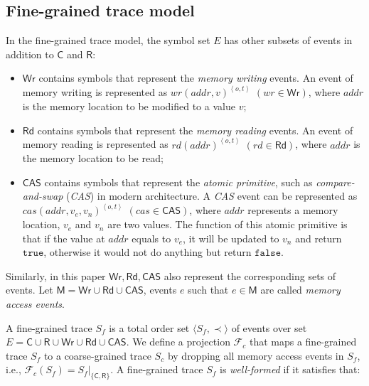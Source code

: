 \documentclass[runningheads]{llncs}
\newcommand{\ecall}{\mathsf{C}}
\newcommand{\eresp}{\mathsf{R}}
\newcommand{\ewrite}{\mathsf{Wr}}
\newcommand{\eread}{\mathsf{Rd}}
\newcommand{\ecas}{\mathsf{CAS}}
\newcommand{\pair}[1]{{\langle{#1}\rangle}}
\begin{document}
\subsection{Fine-grained trace model}\label{sec:finegraintm}


In the fine-grained trace model,  the symbol set $E$ has other subsets of events in addition to $\ecall$ and $\eresp$:

\begin{itemize}
  \item $\ewrite$ contains symbols that represent the \textit{memory writing} events. An event of memory writing is represented as $wr(addr,v)^{\left\langle o,t\right\rangle}$ $(wr \in \ewrite)$, where $addr$ is the memory location to be modified to a value $v$;
  \item $\eread$ contains symbols that represent the \textit{memory reading} events. An event of memory reading is represented as $rd(addr)^{\left\langle o,t\right\rangle}$ $(rd \in \eread)$, where $addr$ is the memory location to be read;
  \item $\ecas$ contains symbols that represent the \textit{atomic primitive}, such as \textit{compare-and-swap} (\textit{CAS}) in modern architecture. A \textit{CAS} event can be represented as $cas(addr, v_e, v_n)^{\left\langle o,t\right\rangle}$ $(cas \in \ecas)$, where $addr$ represents a memory location, $v_e$ and $v_n$ are two values. The function of this atomic primitive is that if the value at $addr$ equals to $v_e$, it will be updated to $v_n$ and return $\mathtt{true}$, otherwise it would not do anything but return $\mathtt{false}$.
\end{itemize}
\noindent Similarly, in this paper $\ewrite, \eread, \ecas$ also represent the corresponding sets of events. Let $\mathsf{M} = \ewrite\cup\eread\cup\ecas$, events $e$ such that $e\in \mathsf{M}$ are called \textit{memory access events}.


A fine-grained trace $S_f$ is a total order set $\pair{S_f,\prec}$ of events over set $E= \ecall\cup \eresp\cup \ewrite\cup \eread\cup \ecas $.
We define a projection $\mathcal{F}_{c}$ that maps a fine-grained trace $S_f$ to a coarse-grained trace $S_c$ by dropping all memory access events in $S_f$, i.e., $ \mathcal{F}_c(S_f) = S_f|_{\{\ecall,\eresp\} }$. A fine-grained trace $S_f$ is \textit{well-formed} if it satisfies that:
\end{document}
